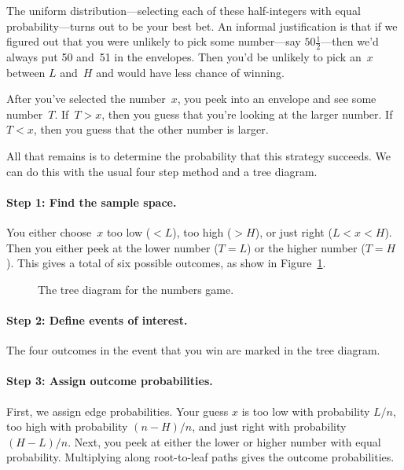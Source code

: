 The uniform distribution---selecting each of these half-integers with
equal probability---turns out to be your best bet.  An informal
justification is that if we figured out that you were unlikely to pick
some number---say $50\frac{1}{2}$---then we'd always put 50 and~51
in the envelopes.  Then you'd be unlikely to pick an~$x$ between $L$
and~$H$ and would have less chance of winning.

After you've selected the number~$x$, you peek into an envelope and
see some number~$T$.  If~$T > x$, then you guess that you're looking
at the larger number.  If~$T < x$, then you guess that the other
number is larger.

All that remains is to determine the probability that this strategy
succeeds.  We can do this with the usual four step method and a tree
diagram.

\paragraph{Step 1: Find the sample space.}

You either choose~$x$ too low ($< L$), too high ($> H$), or just right
($L < x < H$).  Then you either peek at the lower number ($T = L$) or
the higher number ($T = H$).  This gives a total of six possible
outcomes, as show in Figure~\ref{fig:16F4}.

\begin{figure}[h]


\caption{The tree diagram for the numbers game.}

\label{fig:16F4}

\end{figure}

\paragraph{Step 2: Define events of interest.}

The four outcomes in the event that you win are marked in the tree
diagram.

\paragraph{Step 3: Assign outcome probabilities.}

First, we assign edge probabilities.  Your guess $x$ is too low with
probability $L/n$, too high with probability $(n-H)/n$, and just right
with probability $(H-L)/n$.  Next, you peek at either the lower or
higher number with equal probability.  Multiplying along root-to-leaf
paths gives the outcome probabilities.

